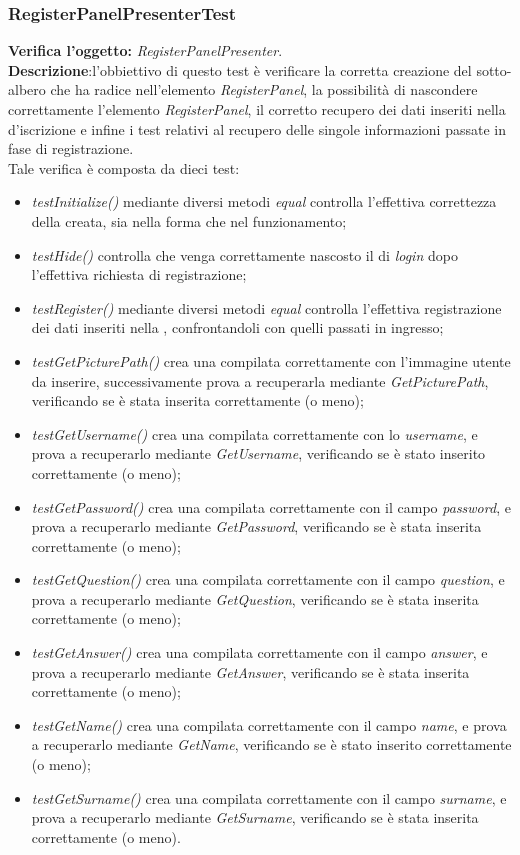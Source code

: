 \subsubsection{RegisterPanelPresenterTest}
\textbf{Verifica l'oggetto:} \textit{RegisterPanelPresenter}.\\
\textbf{Descrizione}:l'obbiettivo di questo test è verificare la corretta creazione del sotto-albero che ha radice nell'elemento \textit{RegisterPanel}, la possibilità di nascondere correttamente l'elemento \textit{RegisterPanel}, il corretto recupero dei dati inseriti nella  d'iscrizione e infine i test relativi al recupero delle singole informazioni passate in fase di registrazione.\\
Tale verifica è composta da dieci test:
\begin{itemize}
\item \textit{testInitialize() } mediante diversi metodi \textit{equal} controlla l'effettiva correttezza della  creata, sia nella forma che nel funzionamento;
\item \textit{testHide() } controlla che venga correttamente nascosto il  di \textit{login} dopo l'effettiva richiesta di registrazione;
\item \textit{testRegister() } mediante diversi metodi \textit{equal} controlla l'effettiva registrazione dei dati inseriti nella , confrontandoli con quelli passati in ingresso;
\item \textit{testGetPicturePath() } crea una  compilata correttamente con l'immagine utente da inserire, successivamente prova a recuperarla mediante \textit{GetPicturePath}, verificando se è stata inserita correttamente (o meno); 
\item \textit{testGetUsername() } crea una  compilata correttamente con lo \textit{username}, e prova a recuperarlo mediante \textit{GetUsername}, verificando se è stato inserito correttamente (o meno);
\item \textit{testGetPassword() } crea una  compilata correttamente con il campo \textit{password}, e prova a recuperarlo mediante \textit{GetPassword}, verificando se è stata inserita correttamente (o meno);
\item \textit{testGetQuestion() }  crea una  compilata correttamente con il campo \textit{question}, e prova a recuperarlo mediante \textit{GetQuestion}, verificando se è stata inserita correttamente (o meno);
\item \textit{testGetAnswer() } crea una  compilata correttamente con il campo \textit{answer}, e prova a recuperarlo mediante \textit{GetAnswer}, verificando se è stata inserita correttamente (o meno);
\item \textit{testGetName() }  crea una  compilata correttamente con il campo \textit{name}, e prova a recuperarlo mediante \textit{GetName}, verificando se è stato inserito correttamente (o meno);
\item \textit{testGetSurname() }  crea una  compilata correttamente con il campo \textit{surname}, e prova a recuperarlo mediante \textit{GetSurname}, verificando se è stata inserita correttamente (o meno).


\end{itemize}
